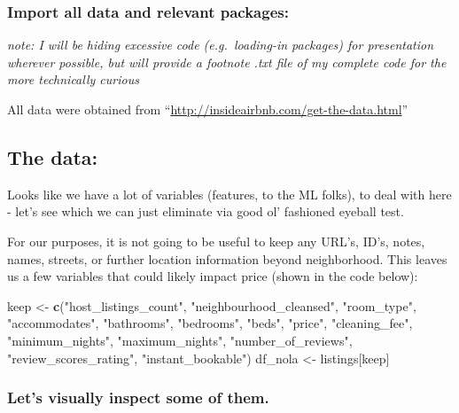 \documentclass[]{article}
\newenvironment{Shaded}{\begin{snugshade}}{\end{snugshade}}
\newcommand{\KeywordTok}[1]{\textcolor[rgb]{0.13,0.29,0.53}{\textbf{#1}}}
\newcommand{\NormalTok}[1]{#1}
\newcommand{\StringTok}[1]{\textcolor[rgb]{0.31,0.60,0.02}{#1}}
\begin{document}
\hypertarget{import-all-data-and-relevant-packages}{%
\subsubsection{Import all data and relevant
packages:}\label{import-all-data-and-relevant-packages}}

\emph{note: I will be hiding excessive code (e.g.~loading-in packages)
for presentation wherever possible, but will provide a footnote .txt
file of my complete code for the more technically curious}

All data were obtained from
``\url{http://insideairbnb.com/get-the-data.html}''

\hypertarget{the-data}{%
\subsection{The data:}\label{the-data}}

Looks like we have a lot of variables (features, to the ML folks), to
deal with here - let's see which we can just eliminate via good ol'
fashioned eyeball test.

For our purposes, it is not going to be useful to keep any URL's, ID's,
notes, names, streets, or further location information beyond
neighborhood. This leaves us a few variables that could likely impact
price (shown in the code below):

\begin{Shaded}
\begin{Highlighting}[]
\NormalTok{keep <-}\StringTok{ }\KeywordTok{c}\NormalTok{(}\StringTok{"host_listings_count"}\NormalTok{, }
          \StringTok{"neighbourhood_cleansed"}\NormalTok{, }\StringTok{"room_type"}\NormalTok{, }\StringTok{"accommodates"}\NormalTok{, }\StringTok{"bathrooms"}\NormalTok{, }\StringTok{"bedrooms"}\NormalTok{, }\StringTok{"beds"}\NormalTok{, }\StringTok{"price"}\NormalTok{, }
          \StringTok{"cleaning_fee"}\NormalTok{, }\StringTok{"minimum_nights"}\NormalTok{, }\StringTok{"maximum_nights"}\NormalTok{, }\StringTok{"number_of_reviews"}\NormalTok{, }\StringTok{"review_scores_rating"}\NormalTok{, }\StringTok{"instant_bookable"}\NormalTok{)}
\NormalTok{df_nola <-}\StringTok{ }\NormalTok{listings[keep]}
\end{Highlighting}
\end{Shaded}

\hypertarget{lets-visually-inspect-some-of-them.}{%
\subsubsection{Let's visually inspect some of
them.}\label{lets-visually-inspect-some-of-them.}}
\end{document}
